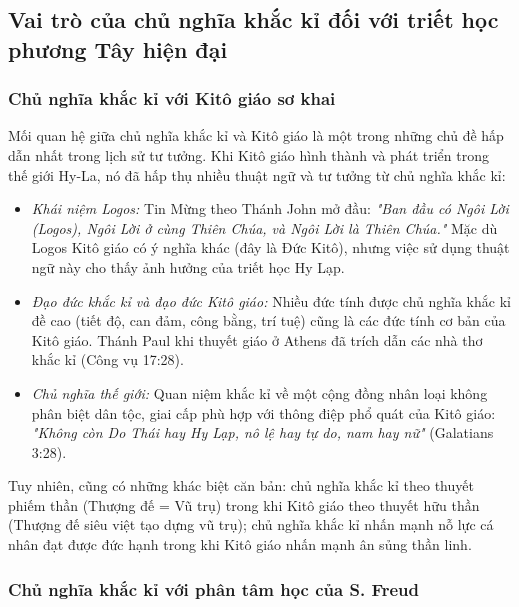 \subsection{Vai trò của chủ nghĩa khắc kỉ đối với triết học phương Tây hiện đại}

\subsubsection{Chủ nghĩa khắc kỉ với Kitô giáo sơ khai}

Mối quan hệ giữa chủ nghĩa khắc kỉ và Kitô giáo là một trong những chủ đề hấp dẫn nhất trong lịch sử tư tưởng. Khi Kitô giáo hình thành và phát triển trong thế giới Hy-La, nó đã hấp thụ nhiều thuật ngữ và tư tưởng từ chủ nghĩa khắc kỉ:

\begin{itemize}[leftmargin=1.5cm]
    \item \textit{Khái niệm Logos:} Tin Mừng theo Thánh John mở đầu: \textit{"Ban đầu có Ngôi Lời (Logos), Ngôi Lời ở cùng Thiên Chúa, và Ngôi Lời là Thiên Chúa."} Mặc dù Logos Kitô giáo có ý nghĩa khác (đây là Đức Kitô), nhưng việc sử dụng thuật ngữ này cho thấy ảnh hưởng của triết học Hy Lạp.
    
    \item \textit{Đạo đức khắc kỉ và đạo đức Kitô giáo:} Nhiều đức tính được chủ nghĩa khắc kỉ đề cao (tiết độ, can đảm, công bằng, trí tuệ) cũng là các đức tính cơ bản của Kitô giáo. Thánh Paul khi thuyết giáo ở Athens đã trích dẫn các nhà thơ khắc kỉ (Công vụ 17:28).
    
    \item \textit{Chủ nghĩa thế giới:} Quan niệm khắc kỉ về một cộng đồng nhân loại không phân biệt dân tộc, giai cấp phù hợp với thông điệp phổ quát của Kitô giáo: \textit{"Không còn Do Thái hay Hy Lạp, nô lệ hay tự do, nam hay nữ"} (Galatians 3:28).
\end{itemize}

Tuy nhiên, cũng có những khác biệt căn bản: chủ nghĩa khắc kỉ theo thuyết phiếm thần (Thượng đế = Vũ trụ) trong khi Kitô giáo theo thuyết hữu thần (Thượng đế siêu việt tạo dựng vũ trụ); chủ nghĩa khắc kỉ nhấn mạnh nỗ lực cá nhân đạt được đức hạnh trong khi Kitô giáo nhấn mạnh ân sủng thần linh.

\subsubsection{Chủ nghĩa khắc kỉ với phân tâm học của S. Freud}

